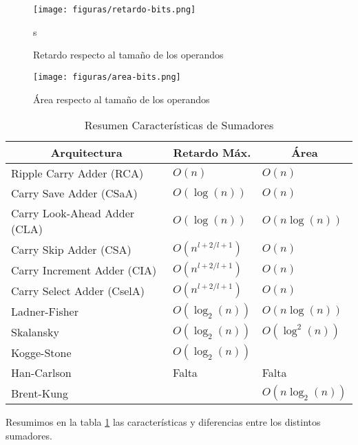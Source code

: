 \begin{figure}[h]
  \centering
\texttt{[image: figuras/retardo-bits.png]}
\vspace{-5pt}
  \caption{Retardo respecto al tamaño de los operandos}s
  \label{retardo-bits}
\vspace{-5pt}
\end{figure}


\begin{figure}[h]
  \centering
\texttt{[image: figuras/area-bits.png]}
\vspace{-1pt}
  \caption{Área respecto al tamaño de los operandos}
  \label{area-bits}
\vspace{-15pt}
\end{figure}

\begin{table}[t]
\caption{Resumen Características de Sumadores}
\centering
\begin{tabular}{|l|l|l|}
\hline
\multicolumn{1}{|c|}{\textbf{Arquitectura}} & \multicolumn{1}{c|}{\textbf{Retardo Máx.   }} & \multicolumn{1}{c|}{\textbf{Área}} \\ \hline
Ripple Carry Adder (RCA) & \(O(n)\) & \(O(n)\) \\ \hline
Carry Save Adder (CSaA) & \(O(\log(n)) \)& \(O(n) \)\\ \hline
Carry Look-Ahead Adder (CLA) & \(O(\log(n))\) & \(O(n\log(n))\) \\ \hline
Carry Skip Adder (CSA) &\(O(n^{l+2/l+1})  \)& \(O(n)\) \\ \hline
Carry Increment Adder (CIA) &\(O(n^{l+2/l+1})  \)& \(O(n)\) \\ \hline
Carry Select Adder (CselA) &\(O(n^{l+2/l+1})  \)& \(O(n)\) \\ \hline
Ladner-Fisher &\( O(\log_2(n))\) & \(O(n\log(n))   \) \\ \hline
Skalansky &\( O(\log_2(n))\) & \(O(\log^2(n))\) \\ \hline
Kogge-Stone & \( O(\log_2(n))\) & \\ \hline
Han-Carlson &Falta &Falta \\ \hline 
Brent-Kung & \(O(\log_2(n))\ & \(O(n\log_2(n))\) \\ \hline

\end{tabular}
\label{sumadores}
\end{table}
Resumimos en la tabla \ref{sumadores} las características y diferencias entre los distintos sumadores\cite{6120598}.


